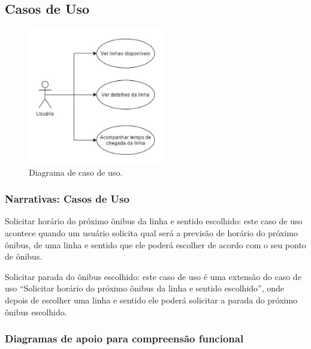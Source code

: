 \documentclass[
	12pt,				%
	oneside,			%
	a4paper,			%
	brazil				%
]{abntex2}
\begin{document}
\subsection{Casos de Uso}

\begin{figure}[!h]
\centering
\includegraphics[width=6cm, center]{images/use-case-diagram.png}
\caption{Diagrama de caso de uso.}
\label{Rotulo}
\end{figure}

\subsubsection{Narrativas: Casos de Uso}

Solicitar horário do próximo ônibus da linha e sentido escolhido: este caso de uso acontece quando um usuário solicita qual será a previsão de horário do próximo ônibus, de uma linha e sentido que ele poderá escolher de acordo com o seu ponto de ônibus.

Solicitar parada do ônibus escolhido: este caso de uso é uma extensão do caso de uso “Solicitar horário do próximo ônibus da linha e sentido escolhido”, onde depois de escolher uma linha e sentido ele poderá solicitar a parada do próximo ônibus escolhido.

\newpage

\subsubsection{Diagramas de apoio para compreensão funcional}
\end{document}
